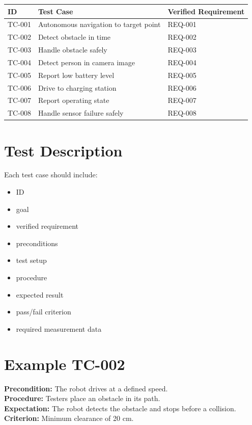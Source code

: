 \begin{longtable}{p{}p{}p{}}
\toprule
ID & Test Case & Verified Requirement\\
\midrule
TC-001 & Autonomous navigation to target point & REQ-001\\
TC-002 & Detect obstacle in time & REQ-002\\
TC-003 & Handle obstacle safely & REQ-003\\
TC-004 & Detect person in camera image & REQ-004\\
TC-005 & Report low battery level & REQ-005\\
TC-006 & Drive to charging station & REQ-006\\
TC-007 & Report operating state & REQ-007\\
TC-008 & Handle sensor failure safely & REQ-008\\
\bottomrule
\end{longtable}

\section{Test Description}
Each test case should include:

\begin{itemize}
    \item ID
    \item goal
    \item verified requirement
    \item preconditions
    \item test setup
    \item procedure
    \item expected result
    \item pass/fail criterion
    \item required measurement data
\end{itemize}

\section{Example TC-002}
\textbf{Precondition:} The robot drives at a defined speed.\\
\textbf{Procedure:} Testers place an obstacle in its path.\\
\textbf{Expectation:} The robot detects the obstacle and stops before a collision.\\
\textbf{Criterion:} Minimum clearance of 20 cm.

